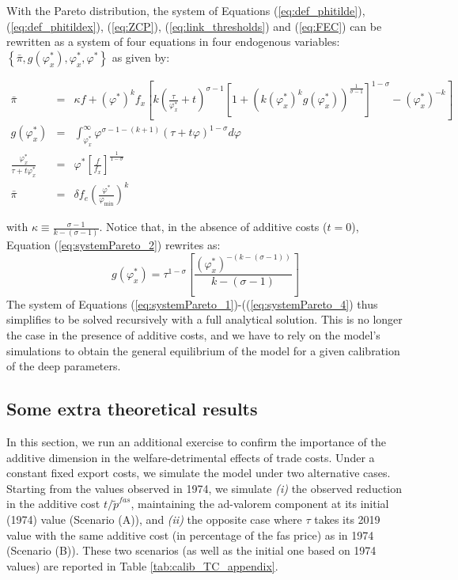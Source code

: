 \documentclass[a4paper,11pt]{article}
\begin{document}
With the Pareto distribution, the system of Equations (\ref{eq:def_phitilde}), (\ref{eq:def_phitildex}), (\ref{eq:ZCP}), (\ref{eq:link_thresholds}) and (\ref{eq:FEC}) can be rewritten as a system of four equations in four endogenous variables: $\left\{\bar{\pi}, g(\varphi_x^\ast),\varphi_x^\ast, \varphi^\ast  \right\}$ as given by:

\begin{eqnarray}
\bar{\pi}&=& \kappa f + \left(\varphi^\ast \right)^k f_x\left[k\left(\frac{\tau}{\varphi_x^\ast}+t  \right)^{\sigma-1}\left[  1+(k(\varphi_x^\ast)^k g(\varphi_x^\ast))^{\frac{1}{\sigma-1}}\right]^{1-\sigma}  - \left( \varphi_x^\ast \right)^{-k} \right] \label{eq:systemPareto_1}\\
g(\varphi_x^\ast)&=&\int_{\varphi_x^\ast}^\infty \varphi^{\sigma-1-(k+1)}(\tau +t\varphi)^{1-\sigma}d\varphi \label{eq:systemPareto_2} \\
\frac{\varphi_x^\ast}{\tau+ t\varphi_x^\ast}&=&\varphi^\ast \left[ \frac{f}{f_x} \right]^{\frac{1}{1-\sigma}} \label{eq:systemPareto_3}\\
\bar{\pi}&=& \delta f_e \left( \frac{\varphi^\ast}{\varphi_{\text{min}}} \right)^k \label{eq:systemPareto_4}
\end{eqnarray}

\noindent with $\kappa \equiv \frac{\sigma-1}{k-(\sigma-1)}$. Notice that, in the absence of additive costs ($t=0$), Equation (\ref{eq:systemPareto_2}) rewrites as:
$$g(\varphi_x^\ast) = \tau^{1-\sigma}\left[ \frac{(\varphi_x^\ast)^{-(k-(\sigma-1))}}{k-(\sigma-1)}\right]$$
The system of Equations (\ref{eq:systemPareto_1})-((\ref{eq:systemPareto_4}) thus simplifies to be solved recursively with a full analytical solution. This is no longer the case in the presence of additive costs, and we have to rely on the model's simulations to obtain the general equilibrium of the model for a given calibration of the deep parameters.


\subsection{Some extra theoretical results}

In this section, we run an additional exercise to confirm the importance of the additive dimension in the welfare-detrimental effects of trade costs. Under a constant fixed export costs, we simulate the model under two alternative cases. Starting from the values observed in 1974, we simulate \textit{(i)} the observed reduction in the additive cost $t/\widetilde{p}^{fas}$, maintaining the ad-valorem component at its initial (1974) value (Scenario (A)), and  \textit{(ii)} the opposite case where $\tau$ takes its 2019 value with the same additive cost (in percentage of the fas price) as in 1974 (Scenario (B)). These two scenarios (as well as the initial one based on 1974 values) are reported in Table \ref{tab:calib_TC_appendix}.
\end{document}
